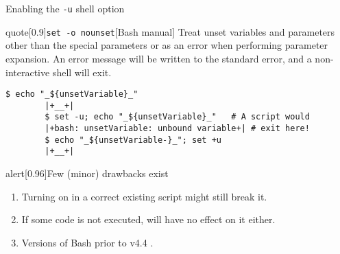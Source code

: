 \begin{frame}[fragile]{Enabling the \;\texttt{-u}\; shell option}
    \vspace{-3mm}
    \begin{varblock}{quote}[0.9\textwidth]{\texttt{set -o nounset}}[Bash manual]
        Treat unset variables and parameters other than the special parameters  or \PB{\texttt{*}} as an error when performing parameter expansion.
        An error message will be written to the standard error, and a non-interactive shell will exit.
    \end{varblock}
    \begin{lstlisting}[style=myBash, numbers=none, belowskip=-4mm]
        $ echo "_${unsetVariable}_"
        |+__+|
        $ set -u; echo "_${unsetVariable}_"   # A script would
        |+bash: unsetVariable: unbound variable+| # exit here!
        $ echo "_${unsetVariable-}_"; set +u
        |+__+|
    \end{lstlisting}
    \PrepareURLsymbol[PP]
    \begin{varblock}{alert}[0.96\textwidth]{Few (minor) drawbacks exist}
        \begin{enumerate}
            \small
            \item Turning  on in a correct existing script might still break it.
            \item If some code is not executed,  will have no effect on it either.
            \item Versions of Bash \alert{prior to v4.4} .
        \end{enumerate}
    \end{varblock}
    \PrepareURLsymbol[PB]
\end{frame}
